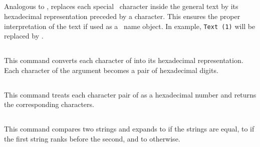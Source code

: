\documentclass{pdftexmanual}
\begin{document}
\subsection{}

Analogous to ,  replaces each
special \PDF\ character inside the general text by its hexadecimal
representation preceded by a \type{#} character. This ensures the proper
interpretation of the text if used as a \PDF\ name object. In example,
\verb|Text (1)| will be replaced by .

\subsection{}

This command converts each character of  into its
hexadecimal representation. Each character of the argument becomes a pair of
hexadecimal digits. 

\subsection{}

This command treats each character pair of  as
a hexadecimal number and returns the corresponding characters.

\subsection{}

This command compares two strings and expands to  if the strings
are equal, to  if the first string ranks before the second, and
to  otherwise.  

\subsection{}
\end{document}
